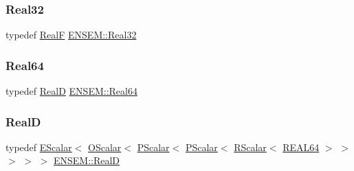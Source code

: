\mbox{\label{group__defs_gab601f1c55eb75baed0a0859b3fec6bc1}} 
\subsubsection{\texorpdfstring{Real32}{Real32}}
{\footnotesize\ttfamily typedef \mbox{\hyperlink{group__defs_gaaff7cc896fceee5b1ea6ba88497469ab}{RealF}} \mbox{\hyperlink{group__defs_gab601f1c55eb75baed0a0859b3fec6bc1}{E\+N\+S\+E\+M\+::\+Real32}}}

\mbox{\label{group__defs_gaae0bff35c031375b1ffeb693402496c8}} 
\subsubsection{\texorpdfstring{Real64}{Real64}}
{\footnotesize\ttfamily typedef \mbox{\hyperlink{group__defs_ga6436522708cc37b1cb43676ea3b4b2fd}{RealD}} \mbox{\hyperlink{group__defs_gaae0bff35c031375b1ffeb693402496c8}{E\+N\+S\+E\+M\+::\+Real64}}}

\mbox{\label{group__defs_ga6436522708cc37b1cb43676ea3b4b2fd}} 
\subsubsection{\texorpdfstring{RealD}{RealD}}
{\footnotesize\ttfamily typedef \mbox{\hyperlink{classENSEM_1_1EScalar}{E\+Scalar}}$<$ \mbox{\hyperlink{classENSEM_1_1OScalar}{O\+Scalar}}$<$ \mbox{\hyperlink{classENSEM_1_1PScalar}{P\+Scalar}}$<$ \mbox{\hyperlink{classENSEM_1_1PScalar}{P\+Scalar}}$<$ \mbox{\hyperlink{classENSEM_1_1RScalar}{R\+Scalar}}$<$ \mbox{\hyperlink{namespaceENSEM_a85b215b9f1f43715aebee01718e25082}{R\+E\+A\+L64}} $>$ $>$ $>$ $>$ $>$ \mbox{\hyperlink{group__defs_ga6436522708cc37b1cb43676ea3b4b2fd}{E\+N\+S\+E\+M\+::\+RealD}}}

\mbox{\label{group__defs_gaaff7cc896fceee5b1ea6ba88497469ab}} 
